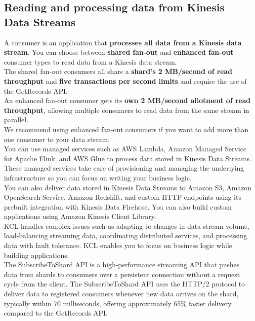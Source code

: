 \documentclass[12pt, letterpaper, twoside]{article}
\begin{document}
\subsection{Reading and processing data from Kinesis Data Streams}
A consumer is an application that \textbf{processes all data from a Kinesis data stream}. You can choose between \textbf{shared fan-out} 
and \textbf{enhanced fan-out} consumer types to read data from a Kinesis data stream.\\
The shared fan-out consumers all share a \textbf{shard’s 2 MB/second of read throughput} and \textbf{five transactions per second limits} 
and require the use of the GetRecords API.\\
An enhanced fan-out consumer gets its \textbf{own 2 MB/second allotment of read throughput}, allowing multiple consumers to read data from 
the same stream in parallel.\\
We recommend using enhanced fan-out consumers if you want to add more than one consumer to your data stream.\\

You can use managed services such as AWS Lambda, Amazon Managed Service for Apache Flink, and AWS Glue to process data stored in Kinesis 
Data Streams. These managed services take care of provisioning and managing the underlying infrastructure so you can focus on writing your 
business logic.\\
You can also deliver data stored in Kinesis Data Streams to Amazon S3, Amazon OpenSearch Service, Amazon Redshift, and custom HTTP 
endpoints using its prebuilt integration with Kinesis Data Firehose. You can also build custom applications using Amazon Kinesis Client 
Library.\\

KCL handles complex issues such as adapting to changes in data stream volume, load-balancing streaming data, coordinating distributed 
services, and processing data with fault tolerance. KCL enables you to focus on business logic while building applications.\\

The SubscribeToShard API is a high-performance streaming API that pushes data from shards to consumers over a persistent connection 
without a request cycle from the client. The SubscribeToShard API uses the HTTP/2 protocol to deliver data to registered consumers 
whenever new data arrives on the shard, typically within 70 milliseconds, offering approximately 65\% faster delivery compared to 
the GetRecords API.\\
\end{document}

